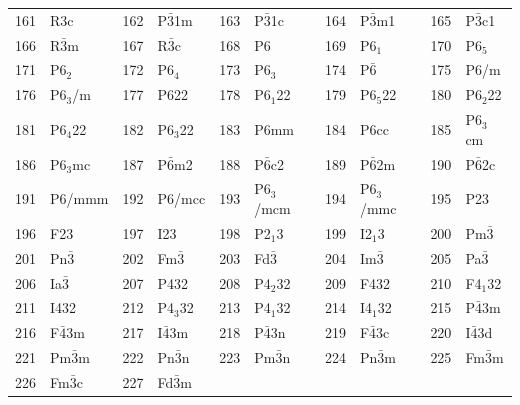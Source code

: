 \documentclass[final,12pt,makeidx,DIV=calc]{article}
\begin{document}
{{{\begin{table}[!h]
\begin{center}
\begin{tabular}{||r|l||r|l||r|l||r|l||r|l||}
161    & R3c                & 
162    & P$\bar{3}$1m       & 
163    & P$\bar{3}$1c       & 
164    & P$\bar{3}$m1       & 
165    & P$\bar{3}$c1       \\
166    & R$\bar{3}$m        & 
167    & R$\bar{3}$c        & 
168    & P6                 & 
169    & P6$_1$             & 
170    & P6$_5$             \\
171    & P6$_2$             & 
172    & P6$_4$             & 
173    & P6$_3$             & 
174    & P$\bar{6}$                & 
175    & P6/m               \\
176    & P6$_3$/m           & 
177    & P622               & 
178    & P6$_1$22           & 
179    & P6$_5$22           & 
180    & P6$_2$22           \\
181    & P6$_4$22           & 
182    & P6$_3$22           & 
183    & P6mm               & 
184    & P6cc               & 
185    & P6$_3$cm           \\
186    & P6$_3$mc           & 
187    & P$\bar{6}$m2       & 
188    & P$\bar{6}$c2       & 
189    & P$\bar{6}$2m       & 
190    & P$\bar{6}$2c       \\
191    & P6/mmm             & 
192    & P6/mcc             & 
193    & P6$_3$/mcm         & 
194    & P6$_3$/mmc         & 
195    & P23                \\
196    & F23                & 
197    & I23                & 
198    & P2$_1$3            & 
199    & I2$_1$3            & 
200    & Pm$\bar{3}$        \\
201    & Pn$\bar{3}$        & 
202    & Fm$\bar{3}$        & 
203    & Fd$\bar{3}$        & 
204    & Im$\bar{3}$        & 
205    & Pa$\bar{3}$        \\
206    & Ia$\bar{3}$        & 
207    & P432               & 
208    & P4$_2$32           & 
209    & F432               & 
210    & F4$_1$32           \\
211    & I432               & 
212    & P4$_3$32           & 
213    & P4$_1$32           & 
214    & I4$_1$32           & 
215    & P$\bar{4}$3m       \\
216    & F$\bar{4}$3m       & 
217    & I$\bar{4}$3m       & 
218    & P$\bar{4}$3n       & 
219    & F$\bar{4}$3c       & 
220    & I$\bar{4}$3d       \\
221    & Pm$\bar{3}$m       & 
222    & Pn$\bar{3}$n       & 
223    & Pm$\bar{3}$n       & 
224    & Pn$\bar{3}$m       & 
225    & Fm$\bar{3}$m       \\
226    & Fm$\bar{3}$c       & 
227    & Fd$\bar{3}$m       & 

\end{tabular}
\end{center}
\end{table}}}}
\end{document}
